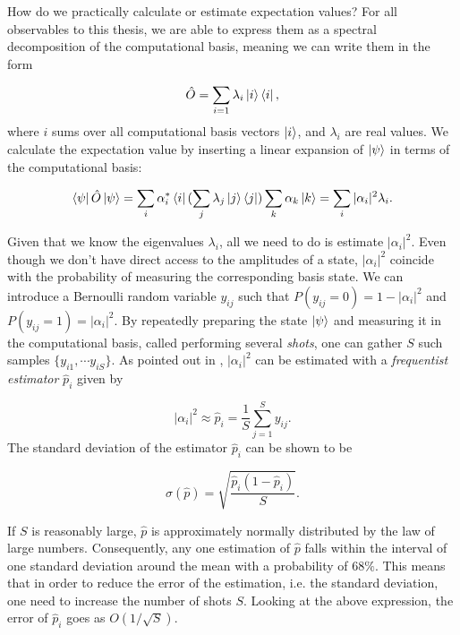 How do we practically calculate or estimate expectation values? For all observables to this thesis, we are able to express them as a spectral decomposition of the computational basis, meaning we can write them in the form 

\begin{equation}\label{eq:ExpectedValue}
    \hat{O} = \sum_{i=1} \lambda_i\ket{i}\bra{i},
\end{equation}
where $i$ sums over all computational basis vectors $\ket{i}$, and $\lambda_i$ are real values. We calculate the expectation value by inserting a linear expansion of $\ket{\psi}$ in terms of the computational basis:

\begin{equation}\label{eq:ExpectedValueExact}
    \bra{\psi}\hat{O}\ket{\psi} = \sum_{i} \alpha_i^*\bra{i}(\sum_{j} \lambda_j\ket{j}\bra{j})\sum_{k} \alpha_k\ket{k} = \sum_{i} |\alpha_i|^2\lambda_i.
\end{equation}

Given that we know the eigenvalues $\lambda_i$, all we need to do is estimate $|\alpha_i|^2$. Even though we don't have direct access to the amplitudes of a state, $|\alpha_i|^2$ coincide with the probability of measuring the corresponding basis state. We can introduce a Bernoulli random variable $y_{ij}$ such that $P(y_{ij} = 0) = 1-|\alpha_i|^2$ and $P(y_{ij} = 1) = |\alpha_i|^2$. By repeatedly preparing the state $\ket{\psi}$ and measuring it in the computational basis, called performing several \emph{shots}, one can gather $S$ such samples $\{y_{i1}, \cdots y_{iS}\}$. As pointed out in \citet{SupervisedwquantumComputers}, $|\alpha_i|^2$ can be estimated with a \emph{frequentist estimator} $\hat{p}_i$ given by

\begin{equation}
    |\alpha_i|^2 \approx \hat{p}_i = \frac{1}{S}\sum_{j=1}^S y_{ij}.
\end{equation}
The standard deviation of the estimator $\hat{p}_i$ can be shown to be

\begin{equation}
    \sigma(\hat{p}) = \sqrt{\frac{\hat{p}_i(1-\hat{p}_i)}{S}}.
\end{equation}


If $S$ is reasonably large, $\hat{p}$ is approximately normally distributed by the law of large numbers. Consequently, any one estimation of $\hat{p}$ falls within the interval of one standard deviation around the mean with a probability of $68\%$. This means that in order to reduce the error of the estimation, i.e. the standard deviation, one need to increase the number of shots $S$. Looking at the above expression, the error of $\hat{p}_i$ goes as $O(1/\sqrt{S})$. 

